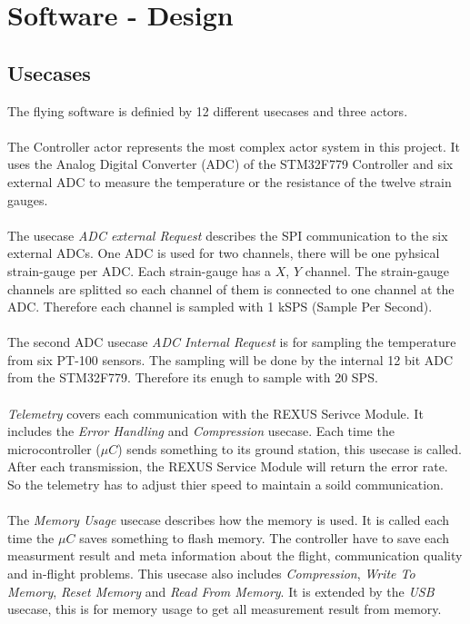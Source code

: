 \section{Software - Design}
\subsection{Usecases}
The flying software is definied by 12 different usecases and three actors. \\ \\
The Controller actor represents the most complex actor system in this project. It uses the Analog Digital Converter (ADC) of the STM32F779 Controller and six external ADC to measure the temperature or the resistance of the twelve strain gauges. \\ \\ 
The usecase \textit{ADC external Request} describes the SPI communication to the six external ADCs. One ADC is used for two channels, there will be one pyhsical strain-gauge per ADC. Each strain-gauge has a $X$, $Y$ channel. The strain-gauge channels are splitted so each channel of them is connected to one channel at the ADC. Therefore each channel is sampled with  1 kSPS (Sample Per Second). \\ \\
The second ADC usecase \textit{ADC Internal Request} is for sampling the temperature from six PT-100 sensors. The sampling will be done by the internal 12 bit ADC from the STM32F779. Therefore its enugh to sample with 20 SPS. \\ \\
\textit{Telemetry} covers each communication with the REXUS Serivce Module. It includes the \textit{Error Handling} and \textit{Compression} usecase. Each time the microcontroller ($\mu C$) sends something to its ground station, this usecase is called. After each transmission, the REXUS Service Module will return the error rate. So the telemetry has to adjust thier speed to maintain a soild communication. \\ \\
The \textit{Memory Usage} usecase describes how the memory is used. It is called each time the $\mu C$ saves something to flash memory. The controller have to save each measurment result and meta information about the flight, communication quality and in-flight problems. This usecase also includes \textit{Compression}, \textit{Write To Memory}, \textit{Reset Memory} and \textit{Read From Memory}. It is extended by the \textit{USB} usecase, this is for memory usage to get all  measurement result from memory. \\ \\ 
